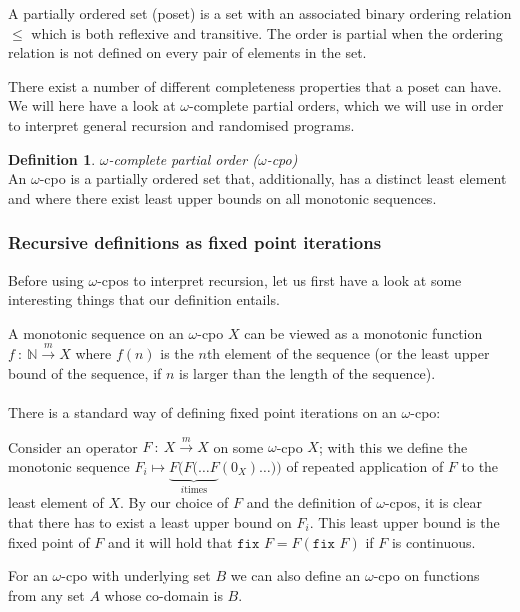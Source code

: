 \documentclass[11pt, leqno]{article}
\theoremstyle{definition}
\newtheorem{defn}[thm]{Definition}
\begin{document}
A partially ordered set (poset) is a set with an associated binary ordering relation
$\leq$ which is both reflexive and transitive. The order is partial when the ordering
relation is not defined on every pair of elements in the set.

There exist a number of different completeness properties that a poset can have.
We will here have a look at $\omega$-complete partial orders, which we will use in
order to interpret general recursion and randomised programs. 

\begin{defn}
  \textit{$\omega$-complete partial order ($\omega$-cpo)}\\
  An $\omega$-cpo is a partially ordered set that, additionally, has a distinct least
  element and where there exist least upper bounds on all monotonic sequences. 
\end{defn}


\subsubsection{Recursive definitions as fixed point iterations}

Before using $\omega$-cpos to interpret recursion, let us first have a look at some
interesting things that our definition entails.

A monotonic sequence on an $\omega$-cpo $X$ can be viewed as a monotonic function
$f~:~\mathbb{N} \xrightarrow{m} X$ where $f(n)$ is the $n$th element of the sequence (or the
least upper bound of the sequence, if $n$ is larger than the length of the
sequence).\\
\\
There is a standard way of defining fixed point iterations on an $\omega$-cpo: %

Consider an operator $F~:~X \xrightarrow{m} X$ on some $\omega$-cpo $X$; with this we
define the monotonic sequence $F_i \mapsto \underbrace{ F(F(\dots F}_{i \text{
    times}} (0_X) \dots))$ of repeated application of $F$ to the least element of $X$.
By our choice of $F$ and the definition of $\omega$-cpos, it is clear that there has
to exist a least upper bound on $F_i$. This least upper bound is the fixed point of
$F$ and it will hold that $\texttt{fix } F = F(\texttt{fix }F)$ if $F$ is
continuous. 

For an $\omega$-cpo with underlying set $B$ we can also define an $\omega$-cpo on
functions from any set $A$ whose co-domain is $B$.
\end{document}
